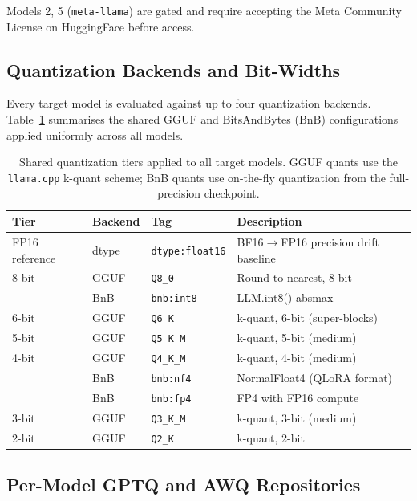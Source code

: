 \noindent
Models 2, 5 (\texttt{meta-llama}) are gated and require accepting the Meta Community License on HuggingFace before access.

\subsection{Quantization Backends and Bit-Widths}
\label{app:quant_tiers}

Every target model is evaluated against up to four quantization backends.
Table~\ref{tab:quant_tiers} summarises the shared GGUF and BitsAndBytes (BnB) configurations applied uniformly across all models.

\begin{table}[h]
\centering
\caption{Shared quantization tiers applied to all target models. GGUF quants use the \texttt{llama.cpp} k-quant scheme; BnB quants use on-the-fly quantization from the full-precision checkpoint.}
\label{tab:quant_tiers}
\small
\begin{tabular}{@{}llll@{}}
\toprule
Tier & Backend & Tag & Description \\
\midrule
FP16 reference & dtype   & \texttt{dtype:float16} & BF16$\to$FP16 precision drift baseline \\
\midrule
8-bit          & GGUF    & \texttt{Q8\_0}         & Round-to-nearest, 8-bit \\
               & BnB     & \texttt{bnb:int8}      & LLM.int8() absmax \\
6-bit          & GGUF    & \texttt{Q6\_K}         & k-quant, 6-bit (super-blocks) \\
5-bit          & GGUF    & \texttt{Q5\_K\_M}      & k-quant, 5-bit (medium) \\
4-bit          & GGUF    & \texttt{Q4\_K\_M}      & k-quant, 4-bit (medium) \\
               & BnB     & \texttt{bnb:nf4}       & NormalFloat4 (QLoRA format) \\
               & BnB     & \texttt{bnb:fp4}       & FP4 with FP16 compute \\
3-bit          & GGUF    & \texttt{Q3\_K\_M}      & k-quant, 3-bit (medium) \\
2-bit          & GGUF    & \texttt{Q2\_K}         & k-quant, 2-bit \\
\bottomrule
\end{tabular}
\end{table}


\subsection{Per-Model GPTQ and AWQ Repositories}
\label{app:gptq_awq}

